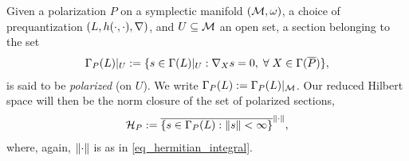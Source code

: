 \documentclass[notas.tex]{subfiles}
\begin{document}
Given a polarization $P$ on a symplectic manifold $(\mathcal{M}, \omega)$, a choice of prequantization $(L, h(\cdot,\cdot), \nabla)$, and $U \subseteq \mathcal{M}$ an open set, a section belonging to the set
\begin{align} \label{eq_pol_sect}
	\sect_\pol(L)|_U := \{s \in \sect(L)|_U: \covd{X} s = 0, \; \forall X \in \Gamma(\overline{\pol})\},
\end{align}
is said to be \emph{polarized} (on $U$). We write $\Gamma_P(L):= \Gamma_P(L)|_{\mathcal{M}}$. Our reduced Hilbert space will then be the norm closure of the set of polarized sections,
\begin{align} \label{eq_reduced_hilb}
	\mathcal{H}_P := \overline{\left \{s \in \Gamma_P(L): \left\lVert s\right\rVert < \infty \right \}}^{\left\lVert\cdot\right\rVert},
\end{align}
where, again, $\left\lVert\cdot\right\rVert$ is as in \eqref{eq_hermitian_integral}.
\end{document}
